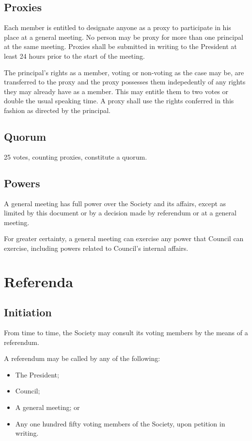 \subsection{Proxies}
Each member is entitled to designate anyone as a proxy to participate in his
place at a general meeting. No person may be proxy for more than one principal
at the same meeting. Proxies shall be submitted in writing to the President at
least 24 hours prior to the start of the meeting.

The principal's rights as a member, voting or non-voting as the case may be, are
transferred to the proxy and the proxy possesses them indepedently of any rights
they may already have as a member. This may entitle them to two votes or double
the usual speaking time. A proxy shall use the rights conferred in this fashion
as directed by the principal.

\subsection{Quorum}
25 votes, counting proxies, constitute a quorum.

\subsection{Powers}
A general meeting has full power over the Society and its affairs, except as
limited by this document or by a decision made by referendum or at a general
meeting.

For greater certainty, a general meeting can exercise any power that Council can
exercise, including powers related to Council's internal affairs.

\section{Referenda}
\subsection{Initiation}
From time to time, the Society may consult its voting members by the means of a
referendum.

A referendum may be called by any of the following:
\begin{itemize}
  \item The President;
  \item Council;
  \item A general meeting; or
  \item Any one hundred fifty voting members of the Society, upon petition in
    writing.
\end{itemize}

